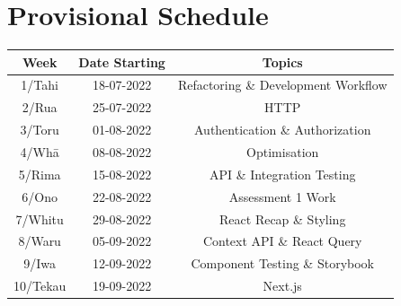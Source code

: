 \documentclass{article}
\begin{document}
\section*{Provisional Schedule}

\renewcommand{\arraystretch}{1.5}
\begin{tabular}{|c|c|c|c|}
	\hline
	\textbf{Week}                  & \textbf{Date Starting}            & \multicolumn{2}{c|}{\textbf{Topics}}                                                                                             \\ \hline
	\footnotesize 1/Tahi           & \footnotesize 18-07-2022 & \multicolumn{2}{c|}{\footnotesize Refactoring \& Development Workflow}    \\ \hline
	\footnotesize 2/Rua            & \footnotesize 25-07-2022 & \multicolumn{2}{c|}{\footnotesize HTTP}                   \\ \hline
	\footnotesize 3/Toru           & \footnotesize 01-08-2022 & \multicolumn{2}{c|}{\footnotesize Authentication \& Authorization} \\ \hline
	\footnotesize 4/Whā            & \footnotesize 08-08-2022 & \multicolumn{2}{c|}{\footnotesize Optimisation}                               \\ \hline
	\footnotesize 5/Rima           & \footnotesize 15-08-2022 & \multicolumn{2}{c|}{\footnotesize API \& Integration Testing}                                                \\ \hline
	\footnotesize 6/Ono            & \footnotesize 22-08-2022 &  \multicolumn{2}{c|}{\footnotesize Assessment 1 Work}                            \\ \hline
	\footnotesize 7/Whitu          & \footnotesize 29-08-2022 & \multicolumn{2}{c|}{\footnotesize React Recap \& Styling}                                                   \\ \hline
	\footnotesize 8/Waru           & \footnotesize 05-09-2022 & \multicolumn{2}{c|}{\footnotesize Context API \& React Query}                                                   \\ \hline
	\footnotesize 9/Iwa            & \footnotesize 12-09-2022 & \multicolumn{2}{c|}{\footnotesize Component Testing \& Storybook}                                                                 \\ \hline
	\footnotesize 10/Tekau         & \footnotesize 19-09-2022 & \multicolumn{2}{c|}{\footnotesize Next.js}                                                                 \\ \hline

\end{tabular}
\end{document}
